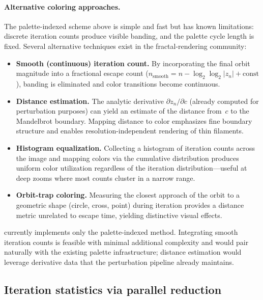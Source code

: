 \paragraph{Alternative coloring approaches.}
The palette-indexed scheme above is simple and fast but has known
limitations: discrete iteration counts produce visible banding, and
the palette cycle length is fixed.  Several alternative techniques
exist in the fractal-rendering community:
\begin{itemize}
  \item \textbf{Smooth (continuous) iteration count.}  By incorporating
    the final orbit magnitude into a fractional escape count
    ($n_{\text{smooth}} = n - \log_2\!\log_2|z_n| + \text{const}$),
    banding is eliminated and color transitions become continuous.
  \item \textbf{Distance estimation.}  The analytic derivative
    $\partial z_n/\partial c$ (already computed for perturbation
    purposes) can yield an estimate of the distance from~$c$ to the
    Mandelbrot boundary.  Mapping distance to color emphasizes fine
    boundary structure and enables resolution-independent rendering of
    thin filaments.
  \item \textbf{Histogram equalization.}  Collecting a histogram of
    iteration counts across the image and mapping colors via the
    cumulative distribution produces uniform color utilization
    regardless of the iteration distribution---useful at deep zooms
    where most counts cluster in a narrow range.
  \item \textbf{Orbit-trap coloring.}  Measuring the closest approach
    of the orbit to a geometric shape (circle, cross, point) during
    iteration provides a distance metric unrelated to escape time,
    yielding distinctive visual effects.
\end{itemize}
\FractalShark{} currently implements only the palette-indexed method.
Integrating smooth iteration counts is feasible with minimal additional
complexity and would
pair naturally with the existing palette infrastructure; distance
estimation would leverage derivative data that the perturbation
pipeline already maintains.

\subsection{Iteration statistics via parallel reduction}
\label{subsec:reduction}

